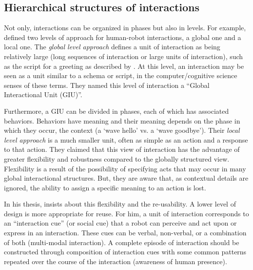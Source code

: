 \documentclass[a4paper,11pt,twoside]{StyleThese}
\begin{document}
\subsection{Hierarchical structures of interactions}\label{chap2:subsec:inter_hier}
Not only, interactions can be organized in phases but also in levels. For example, \cite{dautenhahn_2002_embodied, ogden_2001_interactional} defined two levels of approach for human-robot interactions, a global one and a local one. The \emph{global level approach} defines a unit of interaction as being relatively large (long sequences of interaction or large units of interaction), such as the script for a greeting as described by \cite{kendon_1990_conducting}. At this level, an interaction may be seen as a unit similar to a schema or script, in the computer/cognitive science senses of these terms. They named this level of interaction a ``Global Interactional Unit (GIU)''. 

Furthermore, a GIU can be divided in phases, each of which has associated behaviors. Behaviors have meaning and their meaning depends on the phase in which they occur, the context (\eg a ‘wave hello’ vs. a ‘wave goodbye’). Their \emph{local level approach} is a much smaller unit, often as simple as an action and a response to that action. They claimed that this view of interaction has the advantage of greater flexibility and robustness compared to the globally structured view. Flexibility is a result of the possibility of specifying acts that may occur in many global interactional structures. But, they are aware that, as contextual details are ignored, the ability to assign a specific meaning to an action is lost.

In his thesis, \cite{kuo_2012_designing} insists about this flexibility and the re-usability. A lower level of design is more appropriate for reuse. For him, a unit of interaction corresponds to an ``interaction cue'' (or social cue) that a robot can perceive and act upon or express in an interaction. These cues can be verbal, non-verbal, or a combination of both (multi-modal interaction). A complete episode of interaction should be constructed through composition of interaction cues with some common patterns repeated over the course of the interaction (\eg awareness of human presence).
\end{document}
